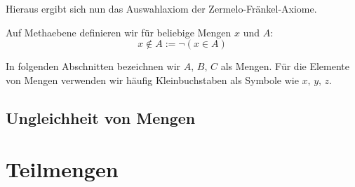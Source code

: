 \documentclass[main.tex]{subfiles}
\begin{document}
Hieraus ergibt sich nun das Auswahlaxiom der Zermelo-Fränkel-Axiome.




Auf Methaebene definieren wir für beliebige Mengen \(x\) und \(A\): \[x\not\in A:=\neg(x\in A)\]

\begin{remark}
In folgenden Abschnitten bezeichnen wir \(A,\, B,\, C\) als Mengen. Für die Elemente von Mengen verwenden wir häufig Kleinbuchstaben als Symbole wie \(x,\, y,\, z\).
\end{remark}

\section{Ungleichheit von Mengen}

\begin{tabproofwide}
\end{tabproofwide}

\begin{tabproof}
\end{tabproof}


\chapter{Teilmengen}
\end{document}
